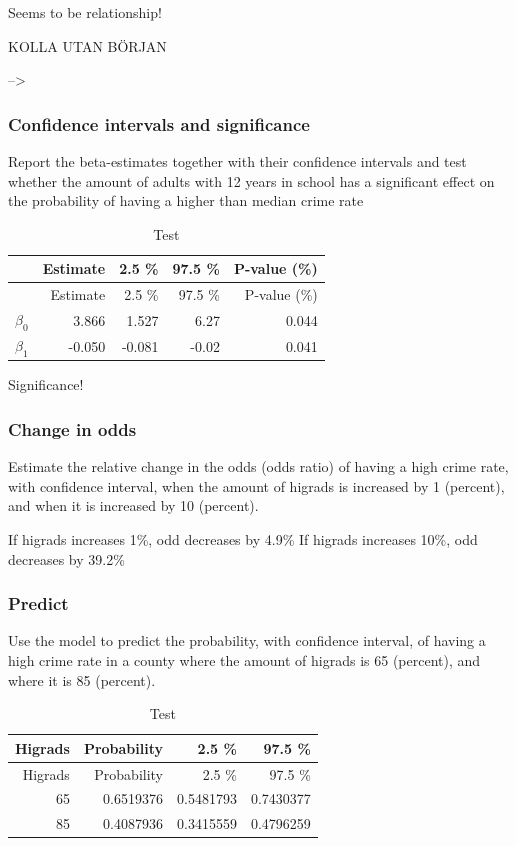 \documentclass[a4paper]{article}
\begin{document}
Seems to be relationship!

KOLLA UTAN BÖRJAN

--\textgreater{}

\hypertarget{confidence-intervals-and-significance}{%
\subsubsection{Confidence intervals and
significance}\label{confidence-intervals-and-significance}}

Report the beta-estimates together with their confidence intervals and
test whether the amount of adults with 12 years in school has a
significant effect on the probability of having a higher than median
crime rate

\begin{longtable}[]{@{}lrrrr@{}}
\caption{Test}\tabularnewline
\toprule
& Estimate & 2.5 \% & 97.5 \% & P-value (\%)\tabularnewline
\midrule
\endfirsthead
\toprule
& Estimate & 2.5 \% & 97.5 \% & P-value (\%)\tabularnewline
\midrule
\endhead
\(\beta_0\) & 3.866 & 1.527 & 6.27 & 0.044\tabularnewline
\(\beta_1\) & -0.050 & -0.081 & -0.02 & 0.041\tabularnewline
\bottomrule
\end{longtable}

Significance!

\hypertarget{change-in-odds}{%
\subsubsection{Change in odds}\label{change-in-odds}}

Estimate the relative change in the odds (odds ratio) of having a high
crime rate, with confidence interval, when the amount of higrads is
increased by 1 (percent), and when it is increased by 10 (percent).

If higrads increases 1\%, odd decreases by 4.9\% If higrads increases
10\%, odd decreases by 39.2\%

\hypertarget{predict}{%
\subsubsection{Predict}\label{predict}}

Use the model to predict the probability, with confidence interval, of
having a high crime rate in a county where the amount of higrads is 65
(percent), and where it is 85 (percent).

\begin{longtable}[]{@{}rrrr@{}}
\caption{Test}\tabularnewline
\toprule
Higrads & Probability & 2.5 \% & 97.5 \%\tabularnewline
\midrule
\endfirsthead
\toprule
Higrads & Probability & 2.5 \% & 97.5 \%\tabularnewline
\midrule
\endhead
65 & 0.6519376 & 0.5481793 & 0.7430377\tabularnewline
85 & 0.4087936 & 0.3415559 & 0.4796259\tabularnewline
\bottomrule
\end{longtable}
\end{document}
